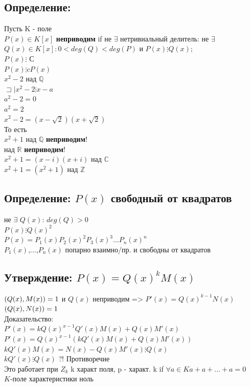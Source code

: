\documentclass[12pt]{article}
\let\gcd\relax
\DeclareMathOperator{\gcd}{НОД}
\begin{document}
\subsection{Определение:}
\noindent Пусть K - поле
\\$P(x)\in K[x]$  \textbf{неприводим} if не $\exists$ нетривиальный делитель: не $\exists$ $Q(x) \in K[x]: 0 < deg(Q) < deg(P)$ и $ P(x) \vdots Q(x) $;
    \\$ P(x) \vdots  $ С
\\$ P(x) \vdots cP(x)$
    \\$x^2 - 2 $ над $\mathbb{Q}$
\\$\sqsupset\mid x^2-2 \vdots x - a$
    \\$a^2-2=0$
\\$a^2=2$
    \\$x^2-2=(x-\sqrt2)(x+\sqrt2)$
\\То есть
\\$x^2+1$ над $\mathbb{Q}$ \textbf{неприводим}!
    \\над $\mathbb{R}$ \textbf{неприводим}!
    \\$x^2+1=(x-i)(x+i)$ над $\mathbb{C}$
\\$x^2+1=(x^2+1)$ над $\mathbb{Z}$
    \subsection{Определение: $P(x)$ свободный от квадратов }
    \noindent не $\exists$ $ Q(x)$: $deg(Q) > 0$
    \\$ P(x) \vdots Q(x)^2 $
\\$ P(x) = {P_1(x)}{P_2(x)^2}{P_3(x)^3}$...${P_n(x)^n}$
    \\${P_1(x)}$,...,${P_n(x)}$ попарно взаимно/пр. и свободны от квадратов
\subsection{Утверждение: $P(x) = Q(x)^kM(x)$}
\noindent $\gcd(Q(x),M(x)) = 1$ и $Q(x)$ неприводим => $P'(x) = Q(x)^{k-1}N(x)$
\\$\gcd(Q(x),N(x)) = 1$
    \\ Доказательство:
    \\$P'(x) = kQ(x)^{x-1}Q'(x)M(x)+Q(x)M'(x)$
\\$P'(x) = Q(x)^{x-1}(kQ'(x)M(x)+Q(x)M'(x))$
    \\$kQ'(x)M(x)=N(x)- Q(x)M'(x) \vdots Q(x)$
\\$kQ'(x)\vdots Q(x)$ ?! Противоречие
    \\Это работает при $Z_k$ k характ поля, p - характ. k if $\forall a\in K a+a+...+a=0 $
    \\$K$-поле характеристики ноль
\end{document}
